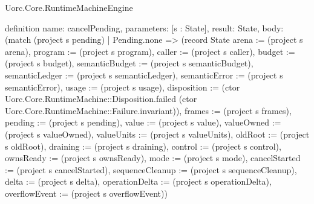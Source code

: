 \begin{lexlean}{Uorc.Core.RuntimeMachineEngine}
\begin{semanticmodule}
definition{
  name: cancelPending,
  parameters: [s : State],
  result: State,
  body: (match (project s pending)
    | Pending.none => (record State {arena := (project s arena), program := (project s program), caller := (project s caller), budget := (project s budget), semanticBudget := (project s semanticBudget), semanticLedger := (project s semanticLedger), semanticError := (project s semanticError), usage := (project s usage), disposition := (ctor Uorc.Core.RuntimeMachine::Disposition.failed (ctor Uorc.Core.RuntimeMachine::Failure.invariant)), frames := (project s frames), pending := (project s pending), value := (project s value), valueOwned := (project s valueOwned), valueUnits := (project s valueUnits), oldRoot := (project s oldRoot), draining := (project s draining), control := (project s control), ownsReady := (project s ownsReady), mode := (project s mode), cancelStarted := (project s cancelStarted), sequenceCleanup := (project s sequenceCleanup), delta := (project s delta), operationDelta := (project s operationDelta), overflowEvent := (project s overflowEvent)})
}
\end{semanticmodule}
\end{lexlean}
